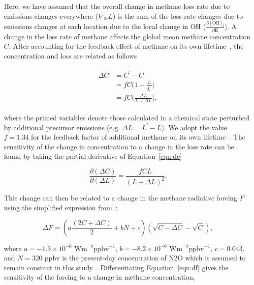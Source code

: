 Here, we have assumed that the overall change in methane loss rate due to emissions changes everywhere ($\nabla_\mathbf{E} L$) is the sum of the loss rate changes due to emissions changes at each location due to the local change in OH ($\frac{\partial \mathrm{[OH]_i}}{\partial \mathbf{E}}$). A change in the loss rate of methane affects the global mean methane concentration $C$. After accounting for the feedback effect of methane on its own lifetime~\citep{ref:fuglestvedt1999,ref:naik2005}, the concentration and loss are related as follows

\begin{equation}
\begin{align}
\begin{split}
\Delta C &= C^{\prime} - C \\
         &= f C \Big(1 - \frac{L}{L^{\prime}}\Big) \\
         &= fC\Big(\frac{\Delta L}{L+\Delta L}\Big),
\end{split}
\label{eqn:dc}
\end{align}
\end{equation}

where the primed variables denote those calculated in a chemical state perturbed by additional precursor emissions (e.g. $\Delta L = L^{\prime}-L$).  We adopt the value $f=1.34$ for the feedback factor of additional methane on its own lifetime~\citep{ref:holmes2013}. The sensitivity of the change in concentration to a change in the loss rate can be found by taking the partial derivative of Equation~\ref{eqn:dc}

\begin{equation}
\frac{\partial (\Delta C)}{\partial (\Delta L)} = \frac{fCL}{(L+\Delta L)^2}.
\label{eqn:dcdl}
\end{equation}

This change can then be related to a change in the methane radiative forcing $F$ using the simplified expression from~\citet{ref:etminan2016}:

\begin{equation}
\Delta F = (a\frac{(2C+\Delta C)}{2} +bN + c)(\sqrt{C-\Delta C} - \sqrt{C}),
\label{eqn:df}
\end{equation}

where $a=-1.3\times 10^{-6}$ $\mathrm{W}\mathrm{m}^{-2}\mathrm{ppbv}^{-1}$, $b=-8.2\times 10^{-6}$ $\mathrm{W}\mathrm{m}^{-2}\mathrm{ppbv}^{-1}$, $c=0.043$, and $N=320$ $\mathrm{ppbv}$ is the present-day concentration of N2O which is assumed to remain constant in this study~\citep{ref:etminan2016}. Differentiating Equation~\ref{eqn:df} gives the sensitivity of the forcing to a change in methane concentration,

